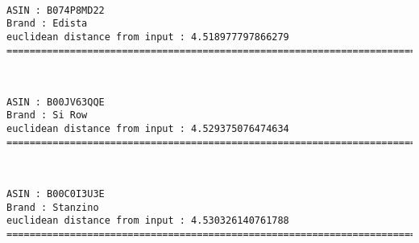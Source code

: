 \documentclass[11pt]{article}
\begin{document}
    
    
    \begin{center}
    \end{center}
    { \hspace*{\fill} \\}
    
    \begin{Verbatim}[commandchars=\\\{\}]
ASIN : B074P8MD22
Brand : Edista
euclidean distance from input : 4.518977797866279
=============================================================================================================================

    \end{Verbatim}

    
    
    \begin{center}
    \end{center}
    { \hspace*{\fill} \\}
    
    \begin{Verbatim}[commandchars=\\\{\}]
ASIN : B00JV63QQE
Brand : Si Row
euclidean distance from input : 4.529375076474634
=============================================================================================================================

    \end{Verbatim}

    
    
    \begin{center}
    \end{center}
    { \hspace*{\fill} \\}
    
    \begin{Verbatim}[commandchars=\\\{\}]
ASIN : B00C0I3U3E
Brand : Stanzino
euclidean distance from input : 4.530326140761788
=============================================================================================================================

    \end{Verbatim}
\end{document}
